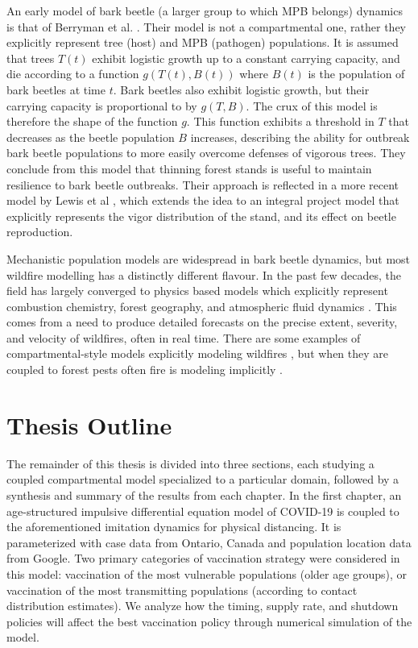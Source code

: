 An early model of bark beetle (a larger group to which MPB belongs) dynamics is that of Berryman et al. \cite{berryman1984metastability}. Their model is not a compartmental one, rather they explicitly represent tree (host) and MPB (pathogen) populations. It is assumed that trees $T(t)$ exhibit logistic growth up to a constant carrying capacity, and die according to a function $g(T(t),B(t))$ where $B(t)$ is the population of bark beetles at time $t$. Bark beetles also exhibit logistic growth, but their carrying capacity is proportional to by $g(T,B)$. The crux of this model is therefore the shape of the function $g$. This function exhibits a threshold in $T$ that decreases as the beetle population $B$ increases, describing the ability for outbreak bark beetle populations to more easily overcome defenses of vigorous trees. They conclude from this model that thinning forest stands is useful to maintain resilience to bark beetle outbreaks. Their approach is reflected in a more recent model by Lewis et al \cite{lewis2010structured}, which extends the idea to an integral project model that explicitly represents the vigor distribution of the stand, and its effect on beetle reproduction. 

Mechanistic population models are widespread in bark beetle dynamics, but most wildfire modelling has a distinctly different flavour. In the past few decades, the field has largely converged to physics based models which explicitly represent combustion chemistry, forest geography, and atmospheric fluid dynamics \cite{linn2002studying,mell2007physics,bakhshaii2019review}. This comes from a need to produce detailed forecasts on the precise extent, severity, and velocity of wildfires, often in real time. There are some examples of compartmental-style models explicitly modeling wildfires \cite{casagrandi1999minimal}, but when they are coupled to forest pests often fire is modeling implicitly \cite{chen2014model}.

\section{Thesis Outline}

The remainder of this thesis is divided into three sections, each studying a coupled compartmental model specialized to a particular domain, followed by a synthesis and summary of the results from each chapter. In the first chapter, an age-structured impulsive differential equation model of COVID-19 is coupled to the aforementioned imitation dynamics for physical distancing. It is parameterized with case data from Ontario, Canada and population location data from Google. Two primary categories of vaccination strategy were considered in this model: vaccination of the most vulnerable populations (older age groups), or vaccination of the most transmitting populations (according to contact distribution estimates). We analyze how the timing, supply rate, and shutdown policies will affect the best vaccination policy through numerical simulation of the model.

